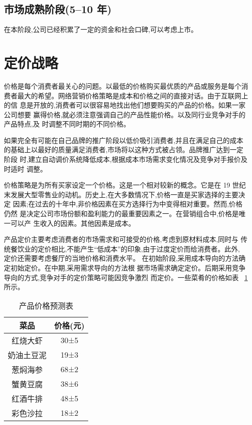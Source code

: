 \subsection{市场成熟阶段(5--10 年)}
在本阶段,公司已经积累了一定的资金和社会口碑,可以考虑上市。

\section{定价战略}
价格是每个消费者最关心的问题。以最低的价格购买最优质的产品或服务是每个消
费者最大的希望。网络营销价格策略是成本和价格之间的直接对话。由于互联网上的信
息是开放的,消费者可以很容易地找出他们想要购买的产品的价格。如果一家公司想要
赢得价格,就必须注意强调自己的产品性能价格。以及同行业竞争对手的产品特点,及
时调整不同时期的不同价格。

如果完全有可能在自己品牌的推广阶段以低价吸引消费者,并且在满足自己的成本
的基础上以最好的质量满足消费者,市场将以这种方式被占领。品牌推广达到一定阶段
时,建立自动调价系统降低成本,根据成本市场需求变化情况及竞争对手报价及时适时
调整。

价格策略是为所有买家设定一个价格。这是一个相对较新的概念。它是在 19 世纪
末发展大型零售业的动机。历史上,在大多数情况下,价格一直是买家选择的主要决定
因素;在过去的十年中,非价格因素在买方选择行为中变得相对重要。然而,价格仍然
是决定公司市场份额和盈利能力的最重要因素之一。在营销组合中,价格是唯一可以产
生收入的因素。其他因素是成本。

产品定价主要考虑消费者的市场需求和可接受的价格,考虑到原材料成本,同时与
传统餐饮业的定价相比,不能产生“低成本”的印象,由于过度定价而给消费者。此外,
定价还需要考虑餐厅的当地价格和消费水平。
在初始阶段,采用成本导向的方法确定初始定价。在中期,采用需求导向的方法根
据市场需求确定定价。后期采用竞争导向的方式,竞争对手的定价策略可能因竞争激烈
而定价。一些菜肴的价格如表 ~\ref{table:price} 所示。

\begin{table}[ htbp ]
\caption{产品价格预测表}
\label{table:price}
\centering
\begin{tabular}{|c|c|}
\hline
菜品&价格(元)\\ \hline
红烧大虾&30±5\\ \hline
奶油土豆泥&19±3\\ \hline
葱焖海参&68±2\\ \hline
蟹黄豆腐&38±6\\ \hline
红酒牛排&48±5\\ \hline
彩色沙拉&18±2\\ \hline
\end{tabular}
\end{table}
